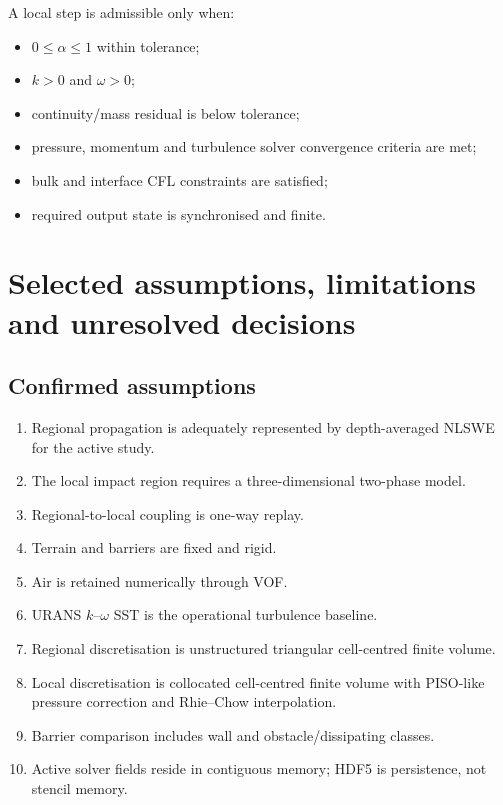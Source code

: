 \documentclass[11pt,a4paper]{article}
\begin{document}
A local step is admissible only when:
\begin{itemize}
  \item $0\le\alpha\le1$ within tolerance;
  \item $k>0$ and $\omega>0$;
  \item continuity/mass residual is below tolerance;
  \item pressure, momentum and turbulence solver convergence criteria are met;
  \item bulk and interface CFL constraints are satisfied;
  \item required output state is synchronised and finite.
\end{itemize}

\section{Selected assumptions, limitations and unresolved decisions}

\subsection{Confirmed assumptions}

\begin{enumerate}
  \item Regional propagation is adequately represented by depth-averaged NLSWE for the active study.
  \item The local impact region requires a three-dimensional two-phase model.
  \item Regional-to-local coupling is one-way replay.
  \item Terrain and barriers are fixed and rigid.
  \item Air is retained numerically through VOF.
  \item URANS $k$--$\omega$ SST is the operational turbulence baseline.
  \item Regional discretisation is unstructured triangular cell-centred finite volume.
  \item Local discretisation is collocated cell-centred finite volume with PISO-like pressure correction and Rhie--Chow interpolation.
  \item Barrier comparison includes wall and obstacle/dissipating classes.
  \item Active solver fields reside in contiguous memory; HDF5 is persistence, not stencil memory.
\end{enumerate}
\end{document}
